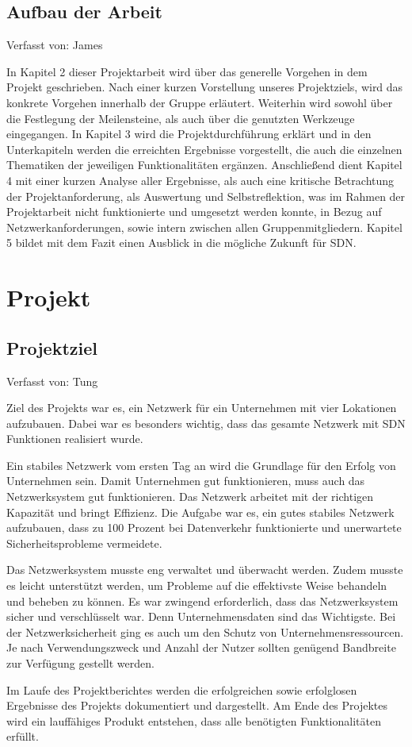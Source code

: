 \documentclass[fontsize=12pt,paper=a4,open=any,parskip=half,
  twoside=false,toc=listof,toc=bibliography,fleqn,leqno,
  captions=nooneline,captions=tableabove,british]{scrbook}
\begin{document}
\section{Aufbau der Arbeit}
{\tiny Verfasst von: James\par}
In Kapitel 2 dieser Projektarbeit wird über das generelle Vorgehen in dem Projekt geschrieben. Nach einer kurzen Vorstellung unseres Projektziels, wird das konkrete Vorgehen innerhalb der Gruppe erläutert. Weiterhin wird sowohl über die Festlegung der Meilensteine, als auch über die genutzten Werkzeuge eingegangen. In Kapitel 3 wird die Projektdurchführung erklärt und in den Unterkapiteln werden die erreichten Ergebnisse vorgestellt, die auch die einzelnen Thematiken der jeweiligen Funktionalitäten ergänzen. Anschließend dient Kapitel 4 mit einer kurzen Analyse aller Ergebnisse, als auch eine kritische Betrachtung der Projektanforderung, als Auswertung und Selbstreflektion, was im Rahmen der Projektarbeit nicht funktionierte und umgesetzt werden konnte, in Bezug auf Netzwerkanforderungen, sowie intern zwischen allen Gruppenmitgliedern. Kapitel 5 bildet mit dem Fazit einen Ausblick in die mögliche Zukunft für SDN.


\chapter{Projekt}
\section{Projektziel}
{\tiny Verfasst von: Tung\par}
Ziel des Projekts war es, ein Netzwerk für ein Unternehmen mit vier Lokationen aufzubauen. Dabei war es besonders wichtig, dass das gesamte Netzwerk mit SDN Funktionen realisiert wurde.\par
Ein stabiles Netzwerk vom ersten Tag an wird die Grundlage für den Erfolg von Unternehmen sein. Damit Unternehmen gut funktionieren, muss auch das Netzwerksystem gut funktionieren. Das Netzwerk arbeitet mit der richtigen Kapazität und bringt Effizienz. Die Aufgabe war es, ein gutes stabiles Netzwerk aufzubauen, dass zu 100 Prozent bei Datenverkehr funktionierte und unerwartete Sicherheitsprobleme vermeidete.\par
Das Netzwerksystem musste eng verwaltet und überwacht werden. Zudem musste es leicht unterstützt werden, um Probleme auf die effektivste Weise behandeln und beheben zu können. Es war zwingend erforderlich, dass das Netzwerksystem sicher und verschlüsselt war. Denn Unternehmensdaten sind das Wichtigste. Bei der Netzwerksicherheit ging es auch um den Schutz von Unternehmensressourcen. Je nach Verwendungszweck und Anzahl der Nutzer sollten genügend Bandbreite zur Verfügung gestellt werden.\par
Im Laufe des Projektberichtes werden die erfolgreichen sowie erfolglosen Ergebnisse des Projekts dokumentiert und dargestellt. Am Ende des Projektes wird ein lauffähiges Produkt entstehen, dass alle benötigten Funktionalitäten erfüllt.  
\end{document}
